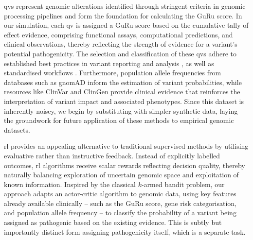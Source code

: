 \ac{qv}s represent genomic alterations identified through stringent criteria in genomic processing pipelines and form the foundation for calculating the GuRu score. In our simulation, each \ac{qv} is assigned a GuRu score based on the cumulative tally of effect evidence, comprising functional assays, computational predictions, and clinical observations, thereby reflecting the strength of evidence for a variant's potential pathogenicity. The selection and classification of these \ac{qv}s adhere to established best practices in variant reporting and analysis \cite{richards2015standards, li2017standards, li2017intervar, riggs2020technical, tavtigian2020fitting}, as well as standardised workflows \cite{pedersen2021effective, anderson2010data, uffelmann2021genome}. Furthermore, population allele frequencies from databases such as gnomAD \cite{karczewski2020mutational} inform the estimation of variant probabilities, while resources like ClinVar \cite{landrum2016clinvar} and ClinGen \cite{rivera2018clingen} provide clinical evidence that reinforces the interpretation of variant impact and associated phenotypes. 
Since this dataset is inherently noisey, we begin by substituting with simpler synthetic data, laying the groundwork for future application of these methods to empirical genomic datasets.

\ac{rl} provides an appealing alternative to traditional supervised methods by utilising evaluative rather than instructive feedback. Instead of explicitly labelled outcomes, \ac{rl} algorithms receive scalar rewards reflecting decision quality, thereby naturally balancing exploration of uncertain genomic space and exploitation of known information. Inspired by the classical $k$-armed bandit problem, our approach adapts an actor-critic algorithm to genomic data, using key features already available clinically -- such as the GuRu score, gene risk categorisation, and population allele frequency -- to classify the probability of a variant being assigned as pathogenic based on the existing evidence.
This is subtly but importantly distinct form assigning pathogenicity itself, which is a separate task.

